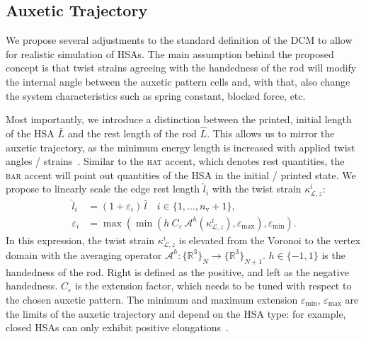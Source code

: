 \subsection{Auxetic Trajectory}\label{sub:hsamodel:hsa_robot_simulation:auxetic_trajectory}
We propose several adjustments to the standard definition of the \gls{DCM} to allow for realistic simulation of \glspl{HSA}.
The main assumption behind the proposed concept is that twist strains agreeing with the handedness of the rod will modify the internal angle between the auxetic pattern cells and, with that, also change the system characteristics such as spring constant, blocked force, etc.

Most importantly, we introduce a distinction between the printed, initial length of the \gls{HSA} $\bar{L}$ and the rest length of the rod $\hat{L}$. 
This allows us to mirror the auxetic trajectory, as the minimum energy length is increased with applied twist angles / strains~\citep{good2022expanding}.
Similar to the \textsc{hat} accent, which denotes rest quantities, the \textsc{bar} accent will point out quantities of the \gls{HSA} in the initial / printed state.
We propose to linearly scale the edge rest length $\hat{l}_i$ with the twist strain $\kappa_{\mathcal{L},z}^i$:
\begin{align}
    \hat{l}_i &= (1 + \varepsilon_i) \, \bar{l} \quad i\in \{1,\dots,n_\mathrm{v}+1\},\\
  \varepsilon_i &= \max \left (\min \left (h \: C_{\varepsilon} \, \mathcal{A}^h(\kappa_{\mathcal{L},z}^i),\varepsilon_\mathrm{max} \right ), \varepsilon_\mathrm{min} \right ).
\end{align}
In this expression, the twist strain $\kappa_{\mathcal{L},z}^i$ is elevated from the Voronoi to the vertex domain with the averaging operator $\mathcal{A}^h : \{\mathbb{R}^3 \}_N \rightarrow \{ \mathbb{R}^3 \}_{N+1}$. $h \in \{ -1, 1 \}$ is the handedness of the rod. Right is defined as the positive, and left as the negative handedness.
$C_{\varepsilon}$ is the extension factor, which needs to be tuned with respect to the chosen auxetic pattern.
The minimum and maximum extension $\varepsilon_\mathrm{min}$, $\varepsilon_\mathrm{max}$ are the limits of the auxetic trajectory and depend on the \gls{HSA} type: for example, closed \glspl{HSA} can only exhibit positive elongations~\citep{good2022expanding}. %
